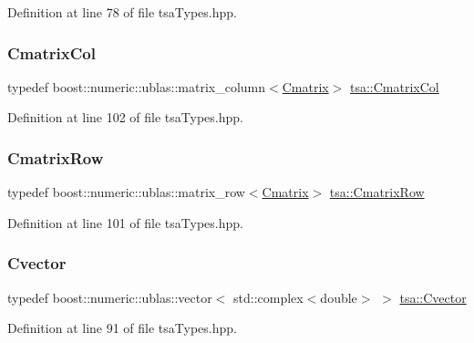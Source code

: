 Definition at line 78 of file tsa\+Types.\+hpp.

\mbox{\label{namespacetsa_a8516debea26c2f85600d808e777d39d2}} 
\subsubsection{\texorpdfstring{Cmatrix\+Col}{CmatrixCol}}
{\footnotesize\ttfamily typedef boost\+::numeric\+::ublas\+::matrix\+\_\+column$<$\hyperlink{namespacetsa_a86348fef1603a135fe5fba9e5f5486ee}{Cmatrix}$>$ \hyperlink{namespacetsa_a8516debea26c2f85600d808e777d39d2}{tsa\+::\+Cmatrix\+Col}}



Definition at line 102 of file tsa\+Types.\+hpp.

\mbox{\label{namespacetsa_ad294f56c16152a1618cbe2f19b768e2e}} 
\subsubsection{\texorpdfstring{Cmatrix\+Row}{CmatrixRow}}
{\footnotesize\ttfamily typedef boost\+::numeric\+::ublas\+::matrix\+\_\+row$<$\hyperlink{namespacetsa_a86348fef1603a135fe5fba9e5f5486ee}{Cmatrix}$>$ \hyperlink{namespacetsa_ad294f56c16152a1618cbe2f19b768e2e}{tsa\+::\+Cmatrix\+Row}}



Definition at line 101 of file tsa\+Types.\+hpp.

\mbox{\label{namespacetsa_a054d1045ead95a65819e9e5722baf600}} 
\subsubsection{\texorpdfstring{Cvector}{Cvector}}
{\footnotesize\ttfamily typedef boost\+::numeric\+::ublas\+::vector$<$ std\+::complex$<$double$>$ $>$ \hyperlink{namespacetsa_a054d1045ead95a65819e9e5722baf600}{tsa\+::\+Cvector}}



Definition at line 91 of file tsa\+Types.\+hpp.

\mbox{\label{namespacetsa_ad260cd21c1891c4ed391fe788569aba4}} 

